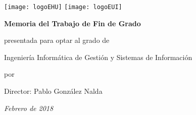 
\begin{titlepage}
	\texttt{[image: logoEHU]}
	\hspace{\fill}
	\texttt{[image: logoEUI]}
	\vspace{1.5cm}
	\begin{center}
		
			\vspace{0.5cm}
		
		{\Huge \textbf{\thetitle}}
		
			\vspace{3cm}
		
		{\large \textbf{Memoria del Trabajo de Fin de Grado}}
		
			\vspace{0.5cm}
		
		{\normalsize presentada para optar al grado de}
		
			\vspace{0.5cm}
			
		{\Large Ingeniería Informática de Gestión y Sistemas de Información}
		
			\vspace{1.5cm}
		
		{\normalsize por}

		\LARGE{\theauthor}
		
			\vspace{1cm}
		
		{\large Director: Pablo González Nalda}
		
			\vspace{2cm}
		
		{\Large\textit{Febrero de 2018}}

	\end{center}
\end{titlepage}

